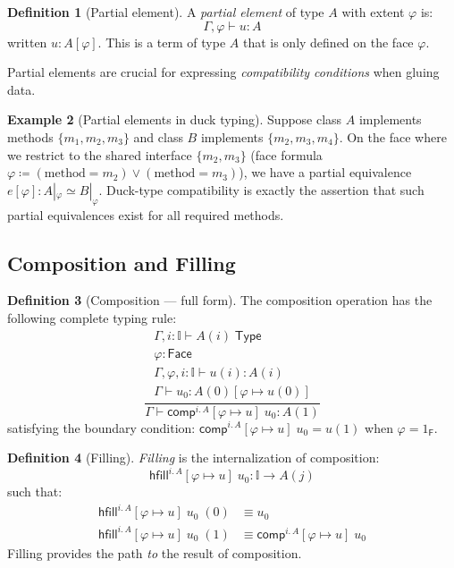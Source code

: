 \documentclass[11pt,a4paper]{report}
\theoremstyle{definition}
\newtheorem{definition}{Definition}[chapter]
\newtheorem{example}[definition]{Example}
\theoremstyle{plain}
\newcommand{\Type}{\mathsf{Type}}
\newcommand{\interval}{\mathbb{I}}
\newcommand{\comp}{\mathsf{comp}}
\newcommand{\hfilling}{\mathsf{hfill}}
\newcommand{\defeq}{\coloneqq}
\begin{document}
\begin{definition}[Partial element]
A \emph{partial element} of type $A$ with extent $\varphi$ is:
\[
  \Gamma, \varphi \vdash u : A
\]
written $u : A[\varphi]$.  This is a term of type $A$ that is only defined on
the face $\varphi$.
\end{definition}

Partial elements are crucial for expressing \emph{compatibility conditions}
when gluing data.

\begin{example}[Partial elements in duck typing]
Suppose class $A$ implements methods $\{m_1, m_2, m_3\}$ and class $B$ implements
$\{m_2, m_3, m_4\}$.  On the face where we restrict to the shared interface
$\{m_2, m_3\}$ (face formula $\varphi \defeq (\text{method} = m_2) \lor (\text{method} = m_3)$),
we have a partial equivalence $e[\varphi] : A|_\varphi \simeq B|_\varphi$.
Duck-type compatibility is exactly the assertion that such partial equivalences
exist for all required methods.
\end{example}

\subsection{Composition and Filling}

\begin{definition}[Composition --- full form]
\label{def:comp-full}
The composition operation has the following complete typing rule:
\[
  \frac{
    \begin{array}{l}
      \Gamma, i : \interval \vdash A(i) \;\Type \\
      \varphi : \mathsf{Face} \\
      \Gamma, \varphi, i : \interval \vdash u(i) : A(i) \\
      \Gamma \vdash u_0 : A(0)[\varphi \mapsto u(0)]
    \end{array}
  }{
    \Gamma \vdash \comp^{i.\,A}[\varphi \mapsto u]\; u_0 : A(1)
  }
\]
satisfying the boundary condition:
$\comp^{i.\,A}[\varphi \mapsto u]\; u_0 = u(1)$ when $\varphi = 1_\mathsf{F}$.
\end{definition}

\begin{definition}[Filling]
\emph{Filling} is the internalization of composition:
\[
  \hfilling^{i.\,A}[\varphi \mapsto u]\; u_0 : \interval \to A(j)
\]
such that:
\begin{align}
  \hfilling^{i.\,A}[\varphi \mapsto u]\; u_0 \; (0) &\equiv u_0 \\
  \hfilling^{i.\,A}[\varphi \mapsto u]\; u_0 \; (1) &\equiv \comp^{i.\,A}[\varphi \mapsto u]\; u_0
\end{align}
Filling provides the path \emph{to} the result of composition.
\end{definition}
\end{document}
